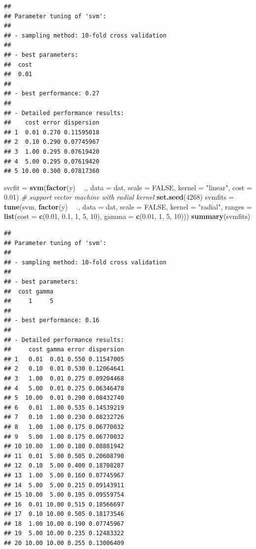 \documentclass[]{article}
\newenvironment{Shaded}{\begin{snugshade}}{\end{snugshade}}
\newcommand{\CommentTok}[1]{\textcolor[rgb]{0.56,0.35,0.01}{\textit{#1}}}
\newcommand{\DataTypeTok}[1]{\textcolor[rgb]{0.13,0.29,0.53}{#1}}
\newcommand{\DecValTok}[1]{\textcolor[rgb]{0.00,0.00,0.81}{#1}}
\newcommand{\FloatTok}[1]{\textcolor[rgb]{0.00,0.00,0.81}{#1}}
\newcommand{\KeywordTok}[1]{\textcolor[rgb]{0.13,0.29,0.53}{\textbf{#1}}}
\newcommand{\NormalTok}[1]{#1}
\newcommand{\OperatorTok}[1]{\textcolor[rgb]{0.81,0.36,0.00}{\textbf{#1}}}
\newcommand{\OtherTok}[1]{\textcolor[rgb]{0.56,0.35,0.01}{#1}}
\newcommand{\StringTok}[1]{\textcolor[rgb]{0.31,0.60,0.02}{#1}}
\begin{document}
\begin{verbatim}
## 
## Parameter tuning of 'svm':
## 
## - sampling method: 10-fold cross validation 
## 
## - best parameters:
##  cost
##  0.01
## 
## - best performance: 0.27 
## 
## - Detailed performance results:
##    cost error dispersion
## 1  0.01 0.270 0.11595018
## 2  0.10 0.290 0.07745967
## 3  1.00 0.295 0.07619420
## 4  5.00 0.295 0.07619420
## 5 10.00 0.300 0.07817360
\end{verbatim}

\begin{Shaded}
\begin{Highlighting}[]
\NormalTok{svcfit =}\StringTok{ }\KeywordTok{svm}\NormalTok{(}\KeywordTok{factor}\NormalTok{(y) }\OperatorTok{~}\StringTok{ }\NormalTok{., }\DataTypeTok{data =}\NormalTok{ dat, }\DataTypeTok{scale =} \OtherTok{FALSE}\NormalTok{, }\DataTypeTok{kernel =} \StringTok{"linear"}\NormalTok{, }
    \DataTypeTok{cost =} \FloatTok{0.01}\NormalTok{)}
\CommentTok{# support vector machine with radial kernel}
\KeywordTok{set.seed}\NormalTok{(}\DecValTok{4268}\NormalTok{)}
\NormalTok{svmfits =}\StringTok{ }\KeywordTok{tune}\NormalTok{(svm, }\KeywordTok{factor}\NormalTok{(y) }\OperatorTok{~}\StringTok{ }\NormalTok{., }\DataTypeTok{data =}\NormalTok{ dat, }\DataTypeTok{scale =} \OtherTok{FALSE}\NormalTok{, }\DataTypeTok{kernel =} \StringTok{"radial"}\NormalTok{, }
    \DataTypeTok{ranges =} \KeywordTok{list}\NormalTok{(}\DataTypeTok{cost =} \KeywordTok{c}\NormalTok{(}\FloatTok{0.01}\NormalTok{, }\FloatTok{0.1}\NormalTok{, }\DecValTok{1}\NormalTok{, }\DecValTok{5}\NormalTok{, }\DecValTok{10}\NormalTok{), }\DataTypeTok{gamma =} \KeywordTok{c}\NormalTok{(}\FloatTok{0.01}\NormalTok{, }\DecValTok{1}\NormalTok{, }\DecValTok{5}\NormalTok{, }
        \DecValTok{10}\NormalTok{)))}
\KeywordTok{summary}\NormalTok{(svmfits)}
\end{Highlighting}
\end{Shaded}

\begin{verbatim}
## 
## Parameter tuning of 'svm':
## 
## - sampling method: 10-fold cross validation 
## 
## - best parameters:
##  cost gamma
##     1     5
## 
## - best performance: 0.16 
## 
## - Detailed performance results:
##     cost gamma error dispersion
## 1   0.01  0.01 0.550 0.11547005
## 2   0.10  0.01 0.530 0.12064641
## 3   1.00  0.01 0.275 0.09204468
## 4   5.00  0.01 0.275 0.06346478
## 5  10.00  0.01 0.290 0.08432740
## 6   0.01  1.00 0.535 0.14539219
## 7   0.10  1.00 0.230 0.08232726
## 8   1.00  1.00 0.175 0.06770032
## 9   5.00  1.00 0.175 0.06770032
## 10 10.00  1.00 0.180 0.08881942
## 11  0.01  5.00 0.505 0.20608790
## 12  0.10  5.00 0.400 0.18708287
## 13  1.00  5.00 0.160 0.07745967
## 14  5.00  5.00 0.215 0.09143911
## 15 10.00  5.00 0.195 0.09559754
## 16  0.01 10.00 0.515 0.18566697
## 17  0.10 10.00 0.505 0.18173546
## 18  1.00 10.00 0.190 0.07745967
## 19  5.00 10.00 0.235 0.12483322
## 20 10.00 10.00 0.255 0.13006409
\end{verbatim}
\end{document}
